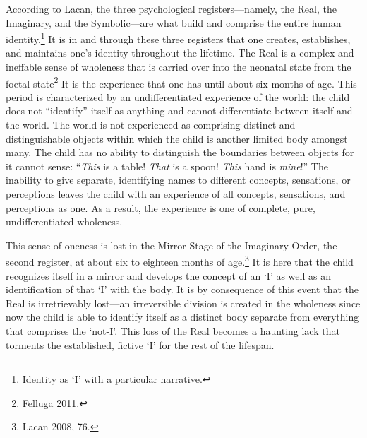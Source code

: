 According to Lacan, the three psychological registers---namely, the
Real, the Imaginary, and the Symbolic---are what build and comprise the
entire human identity.\footnote{Identity as `I' with a particular
  narrative.} It is in and through these three registers that one
creates, establishes, and maintains one's identity throughout the
lifetime. The Real is a complex and ineffable sense of wholeness that is
carried over into the neonatal state from the foetal state\footnote{Felluga
2011.} It is the experience that one has until about six months of age.
This period is characterized by an undifferentiated experience of the
world: the child does not ``identify'' itself as anything and cannot
differentiate between itself and the world. The world is not experienced
as comprising distinct and distinguishable objects within which the
child is another limited body amongst many. The child has no ability to
distinguish the boundaries between objects for it cannot sense:
``\emph{This} is a table! \emph{That} is a spoon! \emph{This} hand is
\emph{mine}!'' The inability to give separate, identifying names to
different concepts, sensations, or perceptions leaves the child with an
experience of all concepts, sensations, and perceptions as one. As a
result, the experience is one of complete, pure, undifferentiated
wholeness.

This sense of oneness is lost in the Mirror Stage of the Imaginary
Order, the second register, at about six to eighteen months of age.\footnote{Lacan 2008, 76.} It is here that the child recognizes itself in a
mirror and develops the concept of an `I' as well as an identification
of that `I' with the body. It is by consequence of this event that the
Real is irretrievably lost---an irreversible division is created in the
wholeness since now the child is able to identify itself as a distinct
body separate from everything that comprises the `not-I'. This loss of
the Real becomes a haunting lack that torments the established, fictive
`I' for the rest of the lifespan.

